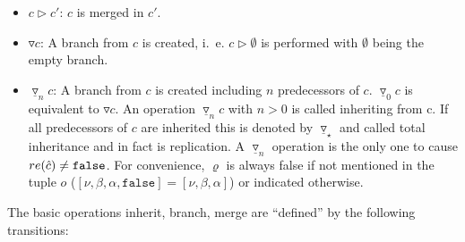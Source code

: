 \documentclass[fleqn, 10pt, a4paper]{article}
\begin{document}
\begin{itemize}
\item $c \rhd c'$: $c$ is merged in $c'$.
\item $\triangledown c$: A branch from $c$ is created, i.~e. $c \rhd \emptyset$
is performed with $\emptyset$ being the empty branch.
\item $\underline\triangledown_n c$: A branch from $c$ is created including $n$
predecessors of $c$. $\underline\triangledown_0 c$ is equivalent to
$\triangledown c$.
An operation $\underline\triangledown_n c$ with $n>0$ is called inheriting from c.
If all predecessors of $c$ are inherited this is denoted
by $\underline\triangledown_\star$
and called total inheritance and in fact is replication. A
$\underline\triangledown_n$ operation is the only one to cause
$\mathnormal{re}(\hat c)\neq \mathtt{false}$. For convenience,
$\varrho$ is always false if not mentioned in the tuple $o$ ($[\nu, \beta, \alpha,
\mathtt{false}]=[\nu, \beta, \alpha]$)
or indicated otherwise.
\end{itemize}

The basic operations inherit, branch, merge are ``defined'' by the
following transitions:	
\end{document}

